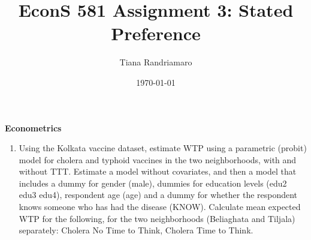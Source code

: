 \documentclass[12pt]{article}
\title{EconS 581 Assignment 3: Stated Preference}
\author[1]{Tiana Randriamaro}
\date{\today}
\begin{document}
  \maketitle
\singlespace
\textbf{Econometrics}
\begin{enumerate}
\item Using the Kolkata vaccine dataset, estimate WTP using a parametric (probit) model for cholera and typhoid vaccines in the two neighborhoods, with and without TTT.  Estimate a model without covariates, and then a model that includes a dummy for gender (male), dummies for education levels (edu2 edu3 edu4), respondent age (age) and a dummy for whether the respondent knows someone who has had the disease (KNOW).  Calculate mean expected WTP for the following, for the two neighborhoods (Beliaghata and Tiljala) separately: Cholera No Time to Think, Cholera Time to Think.\\


\end{enumerate}
\end{document}
